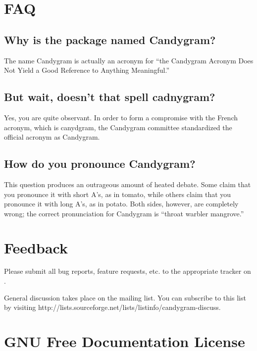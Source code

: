 \documentclass{howto}
\begin{document}
\section{FAQ}

\subsection{Why is the package named Candygram?}
The name Candygram is actually an acronym for ``the Candygram Acronym Does Not
Yield a Good Reference to Anything Meaningful.''

\subsection{But wait, doesn't that spell {\sc cadnygram}?}
Yes, you are quite observant. In order to form a compromise with the French
acronym, which is {\sc canydgram}, the Candygram committee standardized the
official acronym as {\sc Candygram}.

\subsection{How do you pronounce Candygram?}
This question produces an outrageous amount of heated debate. Some claim that
you pronounce it with short A's, as in tomato, while others claim that you
pronounce it with long A's, as in potato. Both sides, however, are completely
wrong; the correct pronunciation for Candygram is ``throat warbler mangrove.''



\section{Feedback}

Please submit all bug reports, feature requests, etc. to the appropriate tracker
on .

General discussion takes place on the
 mailing list. You can subscribe
to this list by visiting 
	{http://lists.sourceforge.net/lists/listinfo/candygram-discuss}.



\appendix
\section{GNU Free Documentation License}
\label{fdl}





\end{document}
